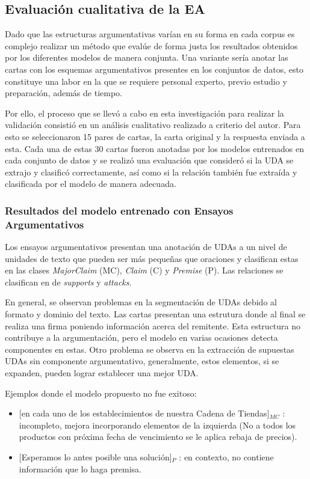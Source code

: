 \documentclass{rcci} %
\begin{document}
\subsection*{Evaluaci\'on cualitativa de la EA}

Dado que las estructuras argumentativas var\'ian en su forma en cada corpus es complejo realizar un m\'etodo que eval\'ue de forma 
justa los resultados obtenidos por los diferentes modelos de manera conjunta. Una variante ser\'ia anotar las cartas 
con los esquemas argumentativos presentes en los conjuntos de datos, esto constituye una labor en la que se requiere
personal experto, previo estudio y preparaci\'on, adem\'as de tiempo. 

Por ello, el proceso que se llev\'o a cabo en esta investigaci\'on para realizar la 
validaci\'on consisti\'o en un an\'alisis cualitativo realizado a criterio del autor. Para esto se seleccionaron 15 pares 
de cartas, la carta original y la respuesta enviada a esta. Cada una de estas 30 cartas fueron anotadas por los modelos entrenados en cada 
conjunto de datos y se realiz\'o una evaluaci\'on que consider\'o si la UDA se extrajo y clasific\'o correctamente, 
as\'i como si la relaci\'on tambi\'en fue extra\'ida y clasificada por el modelo de manera adecuada.

\subsubsection*{Resultados del modelo entrenado con Ensayos Argumentativos}

Los ensayos argumentativos presentan una anotaci\'on de UDAs a un nivel de unidades de texto que pueden ser 
m\'as peque\~nas que oraciones y clasifican estas en las clases \textit{MajorClaim} (MC), \textit{Claim} (C) y \textit{Premise}
(P). Las relaciones se clasifican en de \textit{supports} y \textit{attacks}. 

En general, se observan problemas en la segmentaci\'on de UDAs debido al formato y dominio del texto.
Las cartas presentan una estrutura donde al final se realiza una firma poniendo informaci\'on acerca del remitente.
Esta estructura no contribuye a la argumentaci\'on, pero el modelo en varias ocasiones detecta componentes en estas. 
Otro problema se observa en la extracci\'on de supuestas UDAs sin componente argumentativo,
generalmente, estos elementos, si se expanden, pueden lograr establecer una mejor UDA.

Ejemplos donde el modelo propuesto no fue exitoso:
\begin{itemize}
	\item \text{} [en cada uno de los establecimientos de nuestra Cadena de Tiendas]$_{MC}$
	      : incompleto, mejora incorporando elementos de la izquierda (No a todos los productos con pr\'oxima fecha de vencimiento se le aplica rebaja de precios). %
	\item \text{} [Esperamos lo antes posible una soluci\'on]$_{P}$
	      : en contexto, no contiene informaci\'on que lo haga premisa. %
\end{itemize}
\end{document}
